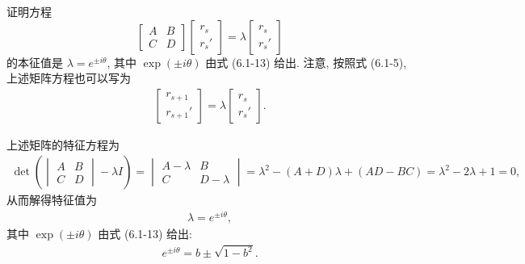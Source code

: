 \documentclass{note}
\begin{document}
\begin{exe}
    证明方程
    \[
        \begin{bmatrix}
            A&B\\
            C&D
        \end{bmatrix}\begin{bmatrix}
            r_s\\
            r_s'
        \end{bmatrix}=\lambda\begin{bmatrix}
            r_s\\
            r_s'
        \end{bmatrix}
    \]
    的本征值是 $\lambda=e^{\pm i\theta}$, 其中 $\exp(\pm i\theta)$ 由式 (6.1-13) 给出. 注意, 按照式 (6.1-5), 上述矩阵方程也可以写为
    \begin{align}
        \begin{bmatrix}
            r_{s+1}\\
            r_{s+1}'
        \end{bmatrix}=\lambda\begin{bmatrix}
            r_s\\
            r_s'
        \end{bmatrix}.
    \end{align}
\end{exe}
\begin{pf}
    上述矩阵的特征方程为
    \begin{align}
        \det\left(\begin{vmatrix}
            A&B\\
            C&D
        \end{vmatrix}-\lambda I\right)=\begin{vmatrix}
            A-\lambda&B\\
            C&D-\lambda
        \end{vmatrix}=\lambda^2-(A+D)\lambda+(AD-BC)=\lambda^2-2\lambda+1=0,
    \end{align}
    从而解得特征值为
    \begin{align}
        \lambda=e^{\pm i\theta},
    \end{align}
    其中 $\exp(\pm i\theta)$ 由式 (6.1-13) 给出:
    \begin{align}
        e^{\pm i\theta}=b\pm\sqrt{1-b^2}.
    \end{align}
\end{pf}
\end{document}
